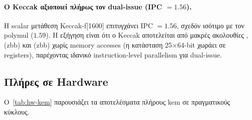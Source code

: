 \paragraph{Ο Keccak αξιοποιεί πλήρως τον dual-issue (IPC $= 1.56$).}
Η scalar μετάθεση Keccak-f[1600] επιτυγχάνει IPC $= 1.56$, σχεδόν ισότιμο
με τον  polymul ($1.59$). Η εξήγηση είναι ότι ο Keccak
αποτελείται από μακρές ακολουθίες ,  (\gls{zbb}) και
 (\gls{zbb}) χωρίς memory accesses (η κατάσταση 25$\times$64-bit
χωράει σε registers), παρέχοντας ιδανικό instruction-level parallelism για
dual-issue.

\subsection{Πλήρες \KEM σε Hardware}
\label{ssec:hw-kem}

Ο~\cref{tab:hw-kem} παρουσιάζει τα αποτελέσματα πλήρους \gls{kem} σε
πραγματικούς κύκλους.

